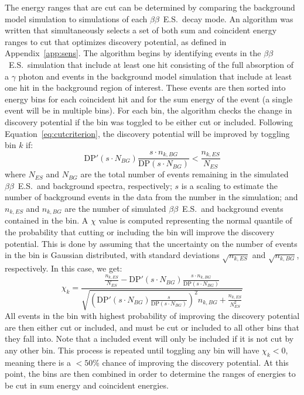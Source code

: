 \documentclass[notitlepage,rmp,aps,10pt]{revtex4-1}
\newcommand{\bb}{${\beta \beta}$}
\newcommand{\bbes}{\bb~E.S.}
\begin{document}
The energy ranges that are cut can be determined by comparing the background model simulation to simulations of each \bbes\ decay mode.
An algorithm was written that simultaneously selects a set of both sum and coincident energy ranges to cut that optimizes discovery potential, as defined in Appendix~\ref{app:sens}.
The algorithm begins by identifying events in the \bbes\ simulation that include at least one hit consisting of the full absorption of a $\gamma$ photon and events in the background model simulation that include at least one hit in the background region of interest.
These events are then sorted into energy bins for each coincident hit and for the sum energy of the event (a single event will be in multiple bins).
For each bin, the algorithm checks the change in discovery potential if the bin was toggled to be either cut or included.
Following Equation~\ref{eq:cutcriterion}, the discovery potential will be improved by toggling bin $k$ if:
\begin{equation}
  \mathrm{DP}'(s\cdot N_{BG})\frac{s\cdot n_{k,BG}}{\mathrm{DP}(s\cdot N_{BG})} < \frac{n_{k,ES}}{N_{ES}}
\end{equation}
where $N_{ES}$ and $N_{BG}$ are the total number of events remaining in the simulated \bbes\ and background spectra, respectively; $s$ is a scaling to estimate the number of background events in the data from the number in the simulation; and $n_{k,ES}$ and $n_{k,BG}$ are the number of simulated \bbes\ and background events contained in the bin.
A $\chi$ value is computed representing the normal quantile of the probability that cutting or including the bin will improve the discovery potential.
This is done by assuming that the uncertainty on the number of events in the bin is Gaussian distributed, with standard deviations $\sqrt{n_{k,ES}}$ and $\sqrt{n_{k,BG}}$, respectively.
In this case, we get:
\begin{equation}
  \chi_k = \frac{ \frac{n_{k,ES}}{N_{ES}} - \mathrm{DP}'(s\cdot N_{BG})\frac{s\cdot n_{k,BG}}{\mathrm{DP}(s\cdot N_{BG})} }{ \sqrt{ \left(\mathrm{DP}'(s\cdot N_{BG})\frac{s}{\mathrm{DP}(s\cdot N_{BG})}\right)^2n_{k,BG} + \frac{n_{k,ES}}{N_{ES}^2} } }
\end{equation}
All events in the bin with highest probability of improving the discovery potential are then either cut or included, and must be cut or included to all other bins that they fall into.
Note that a included event will only be included if it is not cut by any other bin.
This process is repeated until toggling any bin will have $\chi_k<0$, meaning there is a $<50$\% chance of improving the discovery potential.
At this point, the bins are then combined in order to determine the ranges of energies to be cut in sum energy and coincident energies.
\end{document}
